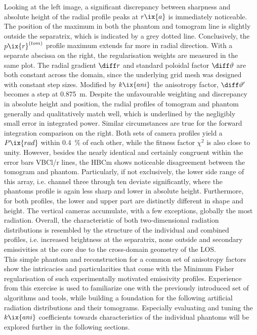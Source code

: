            Looking at the left image, a significant discrepancy between sharpness and absolute height of the radial profile peaks at $r\ix{a}$ is immediately noticeable. The position of the maximum in both the phantom and tomogram line is slightly outside the separatrix, which is indicated by a grey dotted line. Conclusively, the $p\ix{r}^{\left(tom\right)}$ profile maximum extends far more in radial direction. With a separate abscissa on the right, the regularisation weights are measured in the same plot. The radial gradient $\diff r$ and standard poloidal factor $\diff \vartheta$ are both constant across the domain, since the underlying grid mesh was designed with constant step sizes. Modified by $k\ix{ani}$ the anisotropy factor, $\diff \vartheta^{\prime}$ becomes a step at \SI{0.875}{\meter}. Despite the unfavourable weighting and discrepancy in absolute height and position, the radial profiles of tomogram and phantom generally and qualitatively match well, which is underlined by the negligibly small error in integrated power. Similar circumstances are true for the forward integration comparison on the right. Both sets of camera profiles yield a $P\ix{rad}$ within \SI{0.4}{\percent} of each other, while the fitness factor $\chi^{2}$ is also close to unity. However, besides the nearly identical and certainly congruent within the error bars VBCl/r lines, the HBCm shows noticeable disagreement between the tomogram and phantom. Particularly, if not exclusively, the lower side range of this array, i.e. channel three through ten deviate significantly, where the phantoms profile is again less sharp and lower in absolute height. Furthermore, for both profiles, the lower and upper part are distinctly different in shape and height. The vertical cameras accumulate, with a few exceptions, globally the most radiation. Overall, the characteristic of both two-dimensional radiation distributions is resembled by the structure of the individual and combined profiles, i.e. increased brightness at the separatrix, none outside and secondary emissivities at the core due to the cross-domain geometry of the LOS.\\%
           This simple phantom and reconstruction for a common set of anisotropy factors show the intricacies and particularities that come with the Minimum Fisher regularisation of such experimentally motivated emissivity profiles. Experience from this exercise is used to familiarize one with the previously introduced set of algorithms and tools, while building a foundation for the following artificial radiation distributions and their tomograms. Especially evaluating and tuning the $k\ix{ani}$ coefficients towards characteristics of the individual phantoms will be explored further in the following sections.%
%
